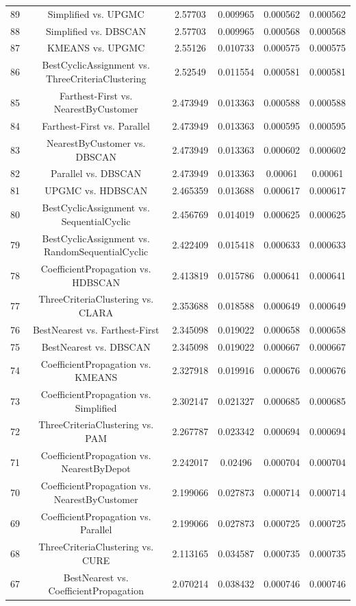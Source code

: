 \documentclass[a4paper,10pt]{article}
\begin{document}
\begin{landscape}
\begin{table}[!htp]
\begin{tabular}{cccccc}
89&Simplified vs. UPGMC&2.57703&0.009965&0.000562&0.000562\\
88&Simplified vs. DBSCAN&2.57703&0.009965&0.000568&0.000568\\
87&KMEANS vs. UPGMC&2.55126&0.010733&0.000575&0.000575\\
86&BestCyclicAssignment vs. ThreeCriteriaClustering&2.52549&0.011554&0.000581&0.000581\\
85&Farthest-First vs. NearestByCustomer&2.473949&0.013363&0.000588&0.000588\\
84&Farthest-First vs. Parallel&2.473949&0.013363&0.000595&0.000595\\
83&NearestByCustomer vs. DBSCAN&2.473949&0.013363&0.000602&0.000602\\
82&Parallel vs. DBSCAN&2.473949&0.013363&0.00061&0.00061\\
81&UPGMC vs. HDBSCAN&2.465359&0.013688&0.000617&0.000617\\
80&BestCyclicAssignment vs. SequentialCyclic&2.456769&0.014019&0.000625&0.000625\\
79&BestCyclicAssignment vs. RandomSequentialCyclic&2.422409&0.015418&0.000633&0.000633\\
78&CoefficientPropagation vs. HDBSCAN&2.413819&0.015786&0.000641&0.000641\\
77&ThreeCriteriaClustering vs. CLARA&2.353688&0.018588&0.000649&0.000649\\
76&BestNearest vs. Farthest-First&2.345098&0.019022&0.000658&0.000658\\
75&BestNearest vs. DBSCAN&2.345098&0.019022&0.000667&0.000667\\
74&CoefficientPropagation vs. KMEANS&2.327918&0.019916&0.000676&0.000676\\
73&CoefficientPropagation vs. Simplified&2.302147&0.021327&0.000685&0.000685\\
72&ThreeCriteriaClustering vs. PAM&2.267787&0.023342&0.000694&0.000694\\
71&CoefficientPropagation vs. NearestByDepot&2.242017&0.02496&0.000704&0.000704\\
70&CoefficientPropagation vs. NearestByCustomer&2.199066&0.027873&0.000714&0.000714\\
69&CoefficientPropagation vs. Parallel&2.199066&0.027873&0.000725&0.000725\\
68&ThreeCriteriaClustering vs. CURE&2.113165&0.034587&0.000735&0.000735\\
67&BestNearest vs. CoefficientPropagation&2.070214&0.038432&0.000746&0.000746\\

\end{tabular}
\end{table}
\end{landscape}
\end{document}
